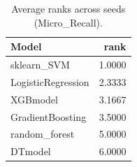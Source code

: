 \begin{table}[t]
\centering
\begin{tabular}{lr}
\toprule
Model & rank \\
\midrule
sklearn_SVM & 1.0000 \\
LogisticRegression & 2.3333 \\
XGBmodel & 3.1667 \\
GradientBoosting & 3.5000 \\
random_forest & 5.0000 \\
DTmodel & 6.0000 \\
\bottomrule
\end{tabular}
\caption{Average ranks across seeds (Micro_Recall).}
\label{tab:avg_rank_Micro_Recall}
\end{table}